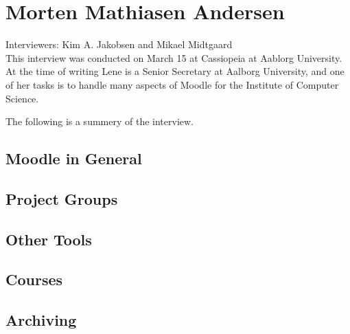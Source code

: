 
\section{Morten Mathiasen Andersen}
\label{sec:morten}
Interviewers: Kim A. Jakobsen and Mikael Midtgaard\\


This interview was conducted on March 15\ths{} at Cassiopeia at Aablorg University.
At the time of writing Lene is a Senior Secretary at Aalborg University, and one of her tasks is to handle many aspects of Moodle for the Institute of Computer Science.

The following is a summery of the interview.

\subsection*{Moodle in General}

\subsection*{Project Groups}


\subsection*{Other Tools}


\subsection*{Courses}

\subsection*{Archiving}
